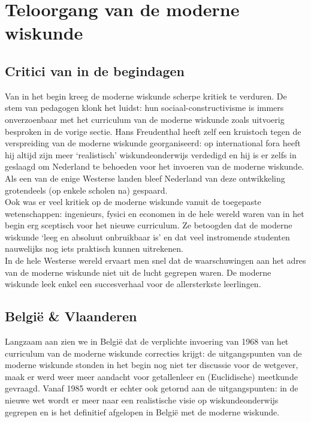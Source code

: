 \documentclass[a4paper,11pt]{article}
\begin{document}
\newpage
\section{Teloorgang van de moderne wiskunde}
\subsection{Critici van in de begindagen}
Van in het begin kreeg de moderne wiskunde scherpe kritiek te verduren. De stem 
van pedagogen klonk het luidst: hun sociaal-constructivisme is immers 
onverzoenbaar met het curriculum van de moderne wiskunde zoals uitvoerig 
besproken in de vorige sectie. Hans Freudenthal heeft zelf een kruistoch tegen 
de verspreiding van de moderne wiskunde georganiseerd: op international fora 
heeft hij altijd zijn meer `realistisch' wiskundeonderwijs verdedigd en hij is 
er zelfs in geslaagd om Nederland te behoeden voor het invoeren van de moderne 
wiskunde. Als een van de enige Westerse landen bleef Nederland van deze 
ontwikkeling grotendeels (op enkele scholen na) gespaard.\\

\noindent Ook was er veel kritiek op de moderne wiskunde vanuit de toegepaste 
wetenschappen: ingenieurs, fysici en economen in de hele wereld waren
van in het begin erg sceptisch voor het nieuwe curriculum. Ze betoogden dat de 
moderne wiskunde `leeg en absoluut onbruikbaar is' en dat veel instromende 
studenten nauwelijks nog iets praktisch kunnen uitrekenen. \\

\noindent In de hele Westerse wereld ervaart men snel dat de waarschuwingen aan het
adres van de moderne wiskunde niet uit de lucht gegrepen waren. De moderne 
wiskunde leek enkel een succesverhaal voor de allersterkste leerlingen. 
\subsection{België \& Vlaanderen}
Langzaam 
aan zien we in België dat de verplichte invoering van 1968 van het curriculum 
van de moderne wiskunde correcties krijgt: de uitgangspunten van de moderne 
wiskunde stonden in het begin nog niet ter discussie voor de wetgever, maak er 
werd weer meer aandacht voor getallenleer en (Euclidische) meetkunde gevraagd. 
Vanaf 1985 wordt er echter ook getornd aan de uitgangspunten: in de nieuwe wet 
wordt er meer naar een realistische visie op wiskundeonderwijs gegrepen en is 
het definitief afgelopen in België met de moderne wiskunde. \\
\end{document}
